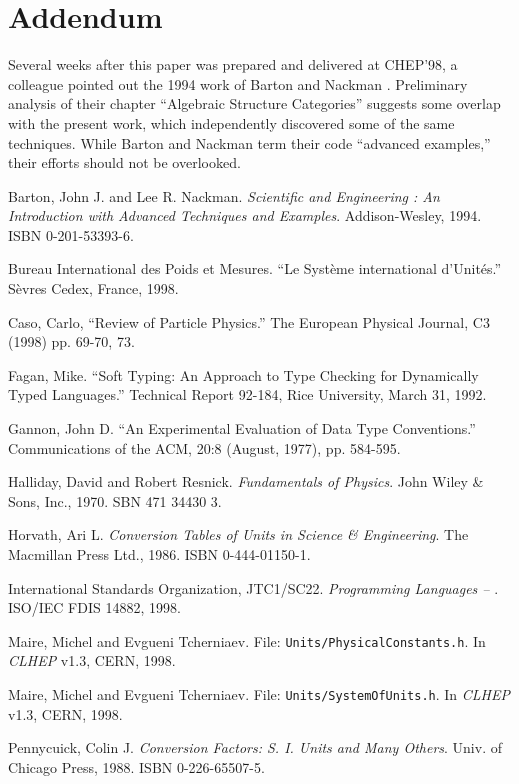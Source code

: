 

\section{ Addendum }

Several weeks after this paper was prepared and delivered at CHEP'98,
a colleague pointed out the 1994 work of Barton and Nackman \cite{Barton}.
Preliminary analysis of their chapter ``Algebraic Structure Categories''
suggests some overlap with the present work,
which independently discovered some of the same techniques.
While Barton and Nackman term their code ``advanced examples,''
their efforts should not be overlooked.




\begin{thebibliography}{99}

  Barton, John J. and Lee R. Nackman.
    {\em Scientific and Engineering \cpp:
    An Introduction with Advanced Techniques and Examples}.
    Addison-Wesley,
    1994.
    ISBN 0-201-53393-6.

  Bureau International des Poids et Mesures.
  ``Le Syst\`{e}me international d'Unit\'{e}s.''
  S\`{e}vres Cedex, France,
  1998.

  Caso, Carlo, \etal
    ``Review of Particle Physics.''
    The European Physical Journal,
    C3 (1998) pp. 69-70, 73.

  Fagan, Mike.
    ``Soft Typing:  An Approach to Type Checking
      for Dynamically Typed Languages.''
    Technical Report 92-184,
    Rice University,
    March 31, 1992.

  Gannon, John D.
    ``An Experimental Evaluation of Data Type Conventions.''
    Communications of the ACM,
    20:8 (August, 1977),
    pp. 584-595.

  Halliday, David and Robert Resnick.
    {\em Fundamentals of Physics}.
    John Wiley \& Sons, Inc.,
    1970.
    SBN 471 34430 3.

  Horvath, Ari L.
    {\em Conversion Tables of Units in Science \& Engineering}.
    The Macmillan Press Ltd.,
    1986.
    ISBN 0-444-01150-1.

  International Standards Organization, JTC1/SC22.
    {\em Programming Languages -- \cpp}.
    ISO/IEC FDIS 14882, 1998.

  Maire, Michel and Evgueni Tcherniaev.
    File:  {\tt Units/PhysicalConstants.h}.
    In {\it CLHEP} v1.3, CERN, 1998.

  Maire, Michel and Evgueni Tcherniaev.
    File:  {\tt Units/SystemOfUnits.h}.
    In {\it CLHEP} v1.3, CERN, 1998.

  Pennycuick, Colin J.
    {\em Conversion Factors:  S. I. Units and Many Others}.
    Univ. of Chicago Press,
    1988.
    ISBN 0-226-65507-5.

\end{thebibliography}





